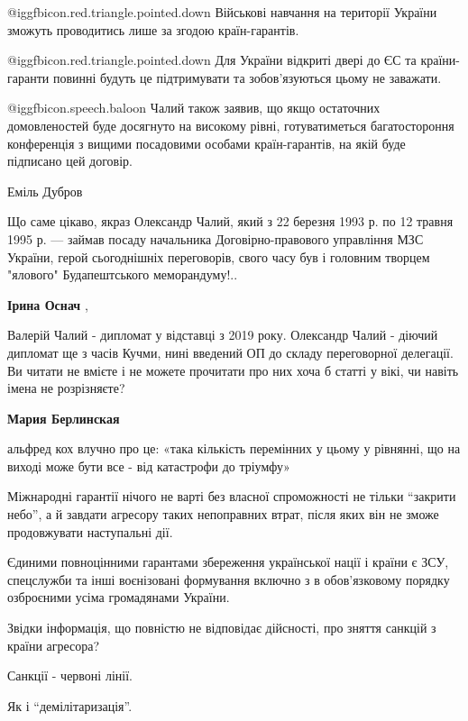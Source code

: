 \begin{itemize}
\begin{itemize}
 @igg{fbicon.red.triangle.pointed.down}  Військові навчання на території України зможуть проводитись лише за згодою
країн-гарантів.

 @igg{fbicon.red.triangle.pointed.down}  Для України відкриті двері до ЄС та країни-гаранти повинні будуть це
підтримувати та зобов'язуються цьому не заважати.

 @igg{fbicon.speech.baloon}  Чалий також заявив, що якщо остаточних домовленостей буде досягнуто на
високому рівні, готуватиметься багатостороння конференція з вищими посадовими
особами країн-гарантів, на якій буде підписано цей договір.

Еміль Дубров

Що саме цікаво, якраз Олександр Чалий, який з 22 березня 1993 р. по 12 травня
1995 р. — займав посаду начальника Договірно-правового управління МЗС України,
герой сьогоднішніх переговорів, свого часу був і головним творцем "ялового"
Будапештського меморандуму!..

\textbf{Ірина Оснач} , 

Валерій Чалий - дипломат у відставці з 2019 року. Олександр Чалий - діючий
дипломат ще з часів Кучми, нині введений ОП до складу переговорної делегації.
Ви читати не вмієте і не можете прочитати про них хоча б статті у вікі, чи
навіть імена не розрізняєте?

\textbf{Мария Берлинская} 

альфред кох влучно про це: «така кількість перемінних у цьому у рівнянні, що на
виході може бути все - від катастрофи до тріумфу»

\end{itemize} %


Міжнародні гарантії нічого не варті без власної спроможності не тільки \enquote{закрити
небо}, а й завдати агресору таких непоправних втрат, після яких він не зможе
продовжувати наступальні дії.

Єдиними повноцінними гарантами збереження української нації і країни є ЗСУ,
спецслужби та інші воєнізовані формування включно з в обов'язковому порядку
озброєними усіма громадянами України.


Звідки інформація, що повністю не відповідає дійсності, про зняття санкцій з
країни агресора?

Санкції - червоні лінії.

Як і \enquote{демілітаризація}.


\end{itemize}
